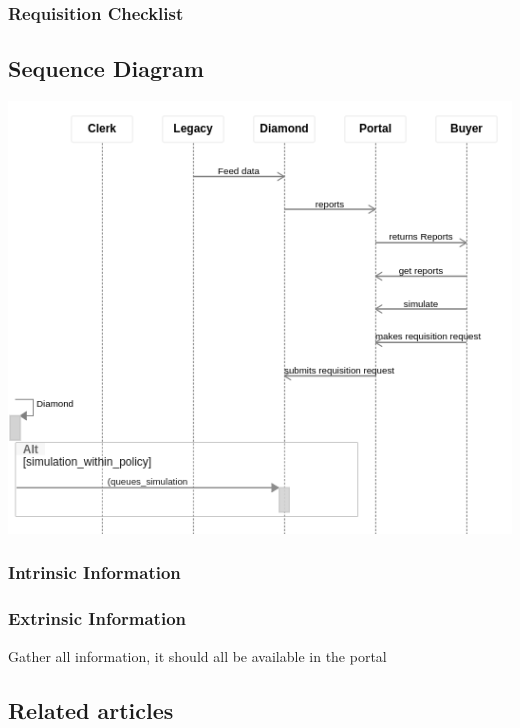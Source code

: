 \documentclass[letterpaper,10pt,english]{sphinxmanual}
\begin{document}
\subsubsection{Requisition Checklist}
\label{Portal/700-Create-Requisition:requisition-checklist}

\subsection{Sequence Diagram}
\label{Portal/700-Create-Requisition:sequence-diagram}
\includegraphics{Requisitions.png}


\subsubsection{Intrinsic Information}
\label{Portal/700-Create-Requisition:intrinsic-information}

\subsubsection{Extrinsic Information}
\label{Portal/700-Create-Requisition:extrinsic-information}
Gather all information, it should all be available in the portal


\subsection{Related articles}
\label{Portal/700-Create-Requisition:related-articles}
\end{document}
